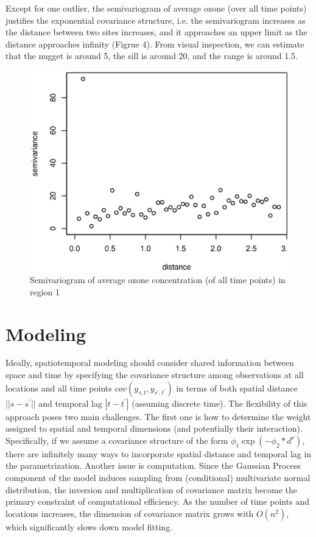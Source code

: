 \documentclass[12pt]{article}
\begin{document}
Except for one outlier, the semivariogram of average ozone (over all time points) justifies the exponential covariance structure, i.e. the semivariogram increases as the distance between two sites increases, and it approaches an upper limit as the distance approaches infinity (Figrue 4). From visual inspection, we can estimate that the nugget is around 5, the sill is around 20, and the range is around 1.5.

\begin{figure}[H]
\centering
\includegraphics[scale = 0.4]{variogram.eps}
\caption{Semivariogram of average ozone concentration (of all time points) in region 1}
\end{figure}

\section{Modeling}
Ideally, spatiotemporal modeling should consider shared information between space and time by specifying the covariance structure among observations at all locations and all time points $cov(y_{s, t}, y_{s^{\prime}, t^{\prime}})$ in terms of both spatial distance $||s - s^{\prime}||$ and temporal lag $|t - t^{\prime}|$ (assuming discrete time). The flexibility of this approach poses two main challenges. The first one is how to determine the weight assigned to spatial and temporal dimensions (and potentially their interaction). Specifically, if we assume a covariance structure of the form $\phi_1 \exp(-\phi_2 * d ^ \nu)$, there are infinitely many ways to incorporate spatial distance and temporal lag in the parametrization. Another issue is computation. Since the Gaussian Process component of the model induces sampling from (conditional) multivariate normal distribution, the inversion and multiplication of covariance matrix become the primary constraint of computational efficiency. As the number of time points and locations increases, the dimension of covariance matrix grows with $O(n^2)$, which significantly slows down model fitting.
\end{document}
